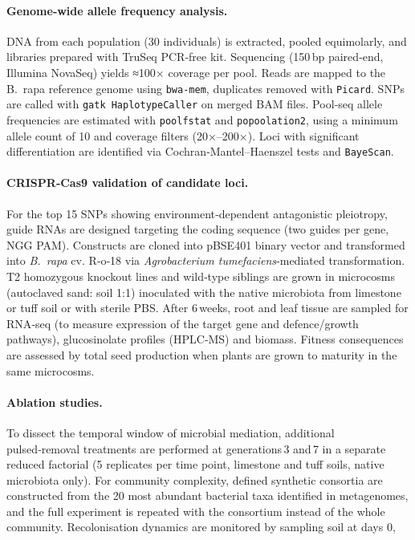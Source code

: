 \documentclass{article}
\begin{document}
\paragraph{Genome‑wide allele frequency analysis.} DNA from each population (30 individuals) is extracted, pooled equimolarly, and libraries prepared with TruSeq PCR‑free kit. Sequencing (150 bp paired‑end, Illumina NovaSeq) yields ≈100× coverage per pool. Reads are mapped to the B.~rapa reference genome using \texttt{bwa‑mem}, duplicates removed with \texttt{Picard}. SNPs are called with \texttt{gatk HaplotypeCaller} on merged BAM files. Pool‑seq allele frequencies are estimated with \texttt{poolfstat} and \texttt{popoolation2}, using a minimum allele count of 10 and coverage filters (20×–200×). Loci with significant differentiation are identified via Cochran‑Mantel–Haenszel tests and \texttt{BayeScan}.

\paragraph{CRISPR‑Cas9 validation of candidate loci.} For the top 15 SNPs showing environment‑dependent antagonistic pleiotropy, guide RNAs are designed targeting the coding sequence (two guides per gene, NGG PAM). Constructs are cloned into pBSE401 binary vector and transformed into \textit{B.~rapa} cv. R‑o‑18 via \textit{Agrobacterium tumefaciens}‑mediated transformation. T2 homozygous knockout lines and wild‑type siblings are grown in microcosms (autoclaved sand: soil 1:1) inoculated with the native microbiota from limestone or tuff soil or with sterile PBS. After 6 weeks, root and leaf tissue are sampled for RNA‑seq (to measure expression of the target gene and defence/growth pathways), glucosinolate profiles (HPLC‑MS) and biomass. Fitness consequences are assessed by total seed production when plants are grown to maturity in the same microcosms.

\paragraph{Ablation studies.} To dissect the temporal window of microbial mediation, additional pulsed‑removal treatments are performed at generations 3 and 7 in a separate reduced factorial (5 replicates per time point, limestone and tuff soils, native microbiota only). For community complexity, defined synthetic consortia are constructed from the 20 most abundant bacterial taxa identified in metagenomes, and the full experiment is repeated with the consortium instead of the whole community. Recolonisation dynamics are monitored by sampling soil at days 0,
\end{document}
